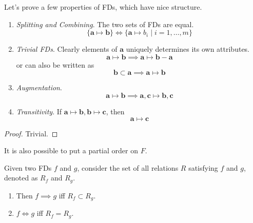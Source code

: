     \begin{theorem}
      Let's prove a few properties of FDs, which have nice structure. 
      \begin{enumerate}
        \item \textit{Splitting and Combining}. The two sets of FDs are equal. 
          \begin{equation}
            \{\mathbf{a} \mapsto \mathbf{b}\} \iff \{ \mathbf{a} \mapsto b_i \mid i = 1, \ldots, m\}
          \end{equation}

        \item \textit{Trivial FDs}. Clearly elements of $\mathbf{a}$ uniquely determines its own attributes. 
          \begin{equation}
            \mathbf{a} \mapsto \mathbf{b} \implies \mathbf{a} \mapsto \mathbf{b} - \mathbf{a}
          \end{equation}
          or can also be written as 
          \begin{equation}
            \mathbf{b} \subset \mathbf{a} \implies \mathbf{a} \mapsto \mathbf{b}
          \end{equation}

        \item \textit{Augmentation}. 
          \begin{equation}
            \mathbf{a} \mapsto \mathbf{b} \implies \mathbf{a}, \mathbf{c} \mapsto \mathbf{b}, \mathbf{c}
          \end{equation}

        \item \textit{Transitivity}. If $\mathbf{a} \mapsto \mathbf{b}, \mathbf{b} \mapsto \mathbf{c}$, then 
          \begin{equation}
            \mathbf{a} \mapsto \mathbf{c}
          \end{equation}
      \end{enumerate}
    \end{theorem}
    \begin{proof}
      Trivial. 
    \end{proof}

    It is also possible to put a partial order on $F$. 

    \begin{definition}
      Given two FDs $f$ and $g$, consider the set of all relations $R$ satisfying $f$ and $g$, denoted as $R_f$ and $R_g$. 
      \begin{enumerate}
        \item Then $f \implies g$ iff $R_f \subset R_g$. 
        \item $f \iff g$ iff $R_f = R_g$. 
      \end{enumerate}
    \end{definition}

